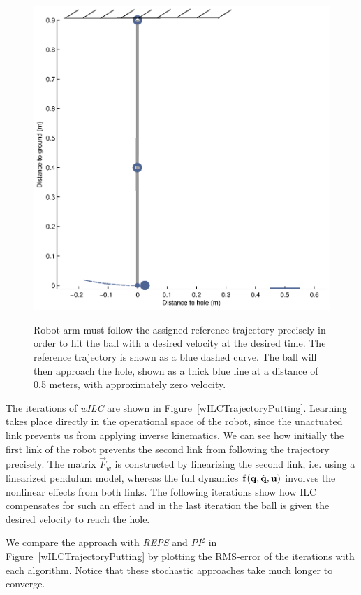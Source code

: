 \begin{figure}[ht]
{\includegraphics[width=1.0\linewidth]{putting1.eps}
\label{fig:subfig2}}
\caption{Robot arm must follow the assigned reference trajectory precisely in order to hit the ball with a desired velocity at the desired time. The reference trajectory is shown as a blue dashed curve. The ball will then approach the hole, shown as a thick blue line at a distance of 0.5 meters, with approximately zero velocity.} 
\label{putting1} 
\end{figure}

The iterations of \emph{wILC} are shown in Figure~\ref{wILCTrajectoryPutting}. Learning takes place directly in the operational space of the robot, since the unactuated link prevents us from applying inverse kinematics. We can see how initially the first link of the robot prevents the second link from following the trajectory precisely. The matrix $\vec{F}_{w}$ is constructed by linearizing the second link, i.e. using a linearized pendulum model, whereas the full dynamics $\boldsymbol{\mathrm{f}}(\boldsymbol{\mathrm{q}},\dot{\boldsymbol{\mathrm{q}}},\boldsymbol{\mathrm{u}})$ involves the nonlinear effects from both links. The following iterations show how ILC compensates for such an effect and in the last iteration the ball is given the desired velocity to reach the hole. 

We compare the approach with \emph{REPS} and \emph{PI$^{2}$} in Figure~\ref{wILCTrajectoryPutting} by plotting the RMS-error of the iterations with each algorithm. Notice that these stochastic approaches take much longer to converge.

